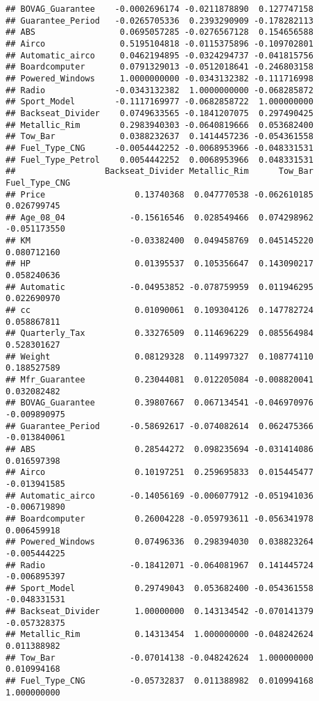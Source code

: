 \documentclass[]{article}
\begin{document}
\begin{verbatim}
## BOVAG_Guarantee    -0.0002696174 -0.0211878890  0.127747158
## Guarantee_Period   -0.0265705336  0.2393290909 -0.178282113
## ABS                 0.0695057285 -0.0276567128  0.154656588
## Airco               0.5195104818 -0.0115375896 -0.109702801
## Automatic_airco     0.0462194895 -0.0324294737 -0.041815756
## Boardcomputer       0.0791329013 -0.0512018641 -0.246803158
## Powered_Windows     1.0000000000 -0.0343132382 -0.111716998
## Radio              -0.0343132382  1.0000000000 -0.068285872
## Sport_Model        -0.1117169977 -0.0682858722  1.000000000
## Backseat_Divider    0.0749633565 -0.1841207075  0.297490425
## Metallic_Rim        0.2983940303 -0.0640819666  0.053682400
## Tow_Bar             0.0388232637  0.1414457236 -0.054361558
## Fuel_Type_CNG      -0.0054442252 -0.0068953966 -0.048331531
## Fuel_Type_Petrol    0.0054442252  0.0068953966  0.048331531
##                  Backseat_Divider Metallic_Rim      Tow_Bar Fuel_Type_CNG
## Price                  0.13740368  0.047770538 -0.062610185   0.026799745
## Age_08_04             -0.15616546  0.028549466  0.074298962  -0.051173550
## KM                    -0.03382400  0.049458769  0.045145220   0.080712160
## HP                     0.01395537  0.105356647  0.143090217   0.058240636
## Automatic             -0.04953852 -0.078759959  0.011946295   0.022690970
## cc                     0.01090061  0.109304126  0.147782724   0.058867811
## Quarterly_Tax          0.33276509  0.114696229  0.085564984   0.528301627
## Weight                 0.08129328  0.114997327  0.108774110   0.188527589
## Mfr_Guarantee          0.23044081  0.012205084 -0.008820041   0.032082482
## BOVAG_Guarantee        0.39807667  0.067134541 -0.046970976  -0.009890975
## Guarantee_Period      -0.58692617 -0.074082614  0.062475366  -0.013840061
## ABS                    0.28544272  0.098235694 -0.031414086   0.016597398
## Airco                  0.10197251  0.259695833  0.015445477  -0.013941585
## Automatic_airco       -0.14056169 -0.006077912 -0.051941036  -0.006719890
## Boardcomputer          0.26004228 -0.059793611 -0.056341978   0.006459918
## Powered_Windows        0.07496336  0.298394030  0.038823264  -0.005444225
## Radio                 -0.18412071 -0.064081967  0.141445724  -0.006895397
## Sport_Model            0.29749043  0.053682400 -0.054361558  -0.048331531
## Backseat_Divider       1.00000000  0.143134542 -0.070141379  -0.057328375
## Metallic_Rim           0.14313454  1.000000000 -0.048242624   0.011388982
## Tow_Bar               -0.07014138 -0.048242624  1.000000000   0.010994168
## Fuel_Type_CNG         -0.05732837  0.011388982  0.010994168   1.000000000

\end{verbatim}
\end{document}
